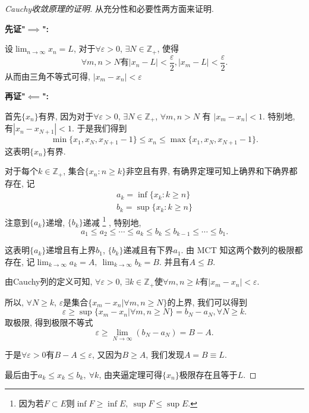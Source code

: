 \begin{proof}[Cauchy收敛原理的证明]
    从充分性和必要性两方面来证明.

    \textbf{先证"$\implies$":}

    设$\displaystyle \lim_{n \to \infty}x_n = L$, 对于$\forall  \varepsilon >0$, $\exists N \in \mathbb{Z}_{+}$, 使得
    \begin{equation}
      \forall m,n >N \text{有} |x_n-L|<\frac{\varepsilon}{2}, |x_m-L|<\frac{\varepsilon}{2}.
    \end{equation}
    从而由三角不等式可得, $|x_m - x_n|<\varepsilon$

    \vspace{1em}
    \textbf{再证"$\impliedby$":}

    首先$\{ x_n \}$有界, 因为对于$\forall \varepsilon>0$, $\exists N \in \mathbb{Z}_{+}$, $\forall m,n >N$ 有 $|x_m-x_n|<1$.
    特别地, 有$|x_{n}-x_{N+1}|<1$. 于是我们得到
    \begin{equation}
      \min\{ x_1,x_N, x_{N+1}-1 \} \le x_n \le \max \{ x_1, x_N, x_{N+1}-1 \}.
    \end{equation}
    这表明$\{ x_n \}$有界.

    对于每个$k\in \mathbb{Z}_{+}$, 集合$\{ x_n \colon n\ge k \}$非空且有界, 有确界定理可知上确界和下确界都存在, 记
    \begin{gather}
        a_k = \inf \{ x_k \colon k\ge n \}
        \\
        b_k = \sup \{ x_k \colon k\ge n \}
    \end{gather}
    注意到$\{ a_k \}$递增, $\{ b_k \}$递减
    \footnote{因为若$F \subset E$则$\inf F \ge  \inf E, \ \sup F \le \sup E$.}
    , 特别地,
    \begin{equation}
      a_1\le a_2\le \cdots \le a_k \le b_k \le b_{k-1} \le \cdots \le b_1.
    \end{equation}

    这表明$\{ a_k \}$递增且有上界$b_1$, $\{ b_k \}$递减且有下界$a_1$.
    由 MCT 知这两个数列的极限都存在, 记$\displaystyle \lim_{k \to \infty}a_k = A ,\ \lim_{k \to \infty} b_k = B$. 并且有$A \le B$.

    由Cauchy列的定义可知, $\forall  \varepsilon > 0$, $\exists k \in \mathbb{Z}_{+}$使$\forall m,n \ge  k$有$|x_m -x_n|< \varepsilon$.
    
    所以, $\forall N \ge k$, $\varepsilon$是集合$\{ x_m -x_n | \forall m,n \ge  N \}$的上界, 我们可以得到
    \begin{equation}
      \varepsilon \ge \sup \{ x_m -x_n | \forall  m,n\ge N \} = b_N - a_N , \forall 
      N \ge  k.
    \end{equation}
    取极限, 得到极限不等式
    \begin{equation}
      \varepsilon \ge \lim_{N \to \infty} \left( b_N -a_N \right) = B -A.
    \end{equation}

    于是$\forall \varepsilon > 0$有$B-A \le  \varepsilon$, 又因为$B \ge A$, 我们发现$A=B \equiv L$.

    最后由于$a_k \le x_k \le b_k, \ \forall k$, 由夹逼定理可得$\{ x_n \}$极限存在且等于$L$.
\end{proof}